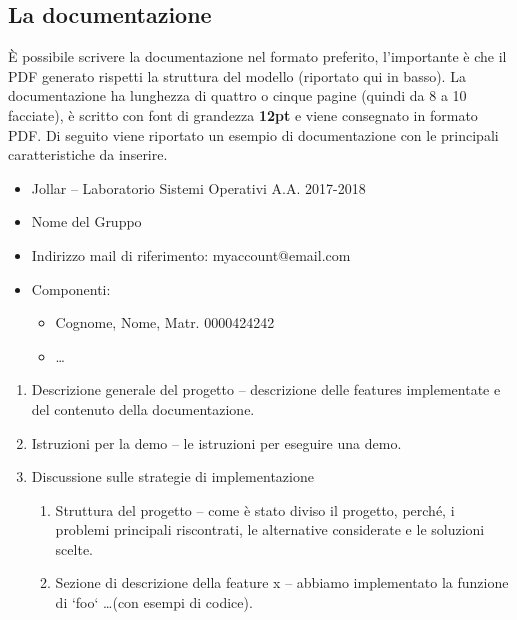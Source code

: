 \subsection{La documentazione}
È possibile scrivere la documentazione nel formato preferito, l'importante è che il PDF generato rispetti la struttura del modello (riportato qui in basso). La documentazione ha lunghezza di quattro o cinque pagine (quindi da 8 a 10 facciate), è scritto con font di grandezza \textbf{12pt} e viene consegnato in formato PDF.
Di seguito viene riportato un esempio di documentazione con le principali caratteristiche da inserire.
\begin{tcolorbox}[colback=green!20!white,colframe=green!75!black,title=L'intestazione della Documentazione]
 \begin{itemize}
  \item Jollar -- Laboratorio Sistemi Operativi A.A. 2017-2018
  \item Nome del Gruppo
  \item Indirizzo mail di riferimento: myaccount@email.com
  \item Componenti:
        \begin{itemize}
         \item Cognome, Nome, Matr. 0000424242
         \item \dots
        \end{itemize}
 \end{itemize}
\end{tcolorbox}
\begin{tcolorbox}[colback=green!20!white,colframe=green!75!black,title=Il corpo della Documentazione]
 \begin{enumerate}
  \item Descrizione generale del progetto -- descrizione delle features implementate e del contenuto della documentazione.
  \item Istruzioni per la demo -- le istruzioni per eseguire una demo.
  \item Discussione sulle strategie di implementazione
        \begin{enumerate}
         \item Struttura del progetto -- come è stato diviso il progetto, perché, i problemi principali riscontrati, le alternative considerate e le soluzioni scelte.
         \item Sezione di descrizione della feature x -- abbiamo implementato la funzione di `foo` \dots (con esempi di codice).
        \end{enumerate}
 \end{enumerate}
\end{tcolorbox}

